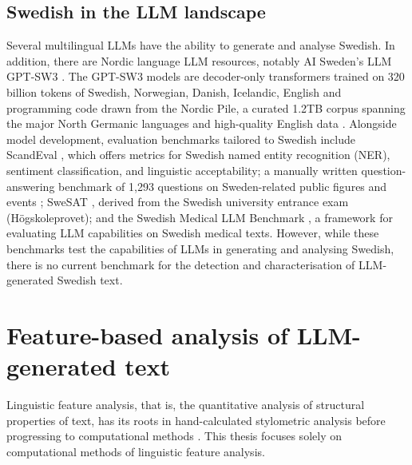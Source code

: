 \documentclass[thesis]{cluu}
\begin{document}
\subsection{Swedish in the LLM landscape}
\label{sec:swedish-llm}
Several multilingual LLMs have the ability to generate and analyse Swedish. In addition, there are Nordic language LLM resources, notably AI Sweden's LLM GPT-SW3 \parencite{ekgren2024gptsw3}. The GPT-SW3 models are decoder-only transformers trained on 320 billion tokens of Swedish, Norwegian, Danish, Icelandic, English and programming code drawn from the Nordic Pile, a curated 1.2TB corpus spanning the major North Germanic languages and high-quality English data \parencite{ohman2023nordic}. Alongside model development, evaluation benchmarks tailored to Swedish include ScandEval \parencite{nielsen2023scandeval}, which offers metrics for Swedish named entity
recognition (NER), sentiment classification, and linguistic
acceptability; a manually written question-answering benchmark of 1,293 questions on Sweden-related public figures and events \parencite{kunz2025}; SweSAT \parencite{kurfali2025swesat}, derived from the Swedish
university entrance exam (Högskoleprovet); and the Swedish Medical LLM
Benchmark \parencite{moell2025swedishmed}, a framework for evaluating
LLM capabilities on Swedish medical texts. However, while these benchmarks test the capabilities of LLMs in generating and analysing Swedish, there is no current benchmark for the detection and characterisation of LLM-generated Swedish text.

\section{Feature-based analysis of LLM-generated text}
 Linguistic feature analysis, that is, the quantitative analysis of structural properties of text, has its roots in hand-calculated stylometric analysis \parencite{mosteller1963} before progressing to computational methods \parencite{sundararajan-woodard-2018-represents, belvisi2020forensicauthorshipanalysismicroblogging, huang2025authorship}. This thesis focuses solely on computational methods of linguistic feature analysis.
\end{document}
